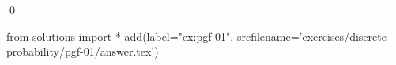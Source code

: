 
\begin{ex} 
  \label{ex:pgf-01}
  
  \qed
\end{ex} 
\begin{python0}
from solutions import *
add(label="ex:pgf-01",
    srcfilename='exercises/discrete-probability/pgf-01/answer.tex') 
\end{python0}
